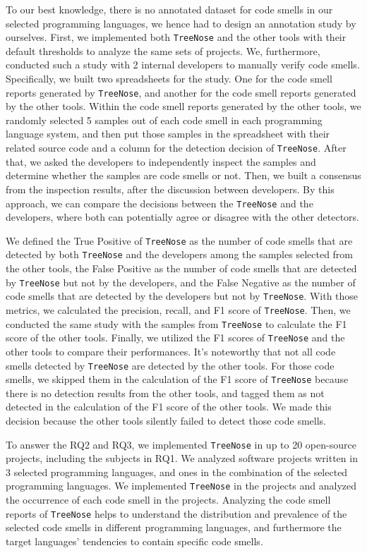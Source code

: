 To our best knowledge, there is no annotated dataset for code smells in our
selected programming languages, we hence had to design an annotation study by
ourselves. First, we implemented both \texttt{TreeNose} and the other tools
with their default thresholds to analyze the same sets of projects. We,
furthermore, conducted such a study with 2 internal developers to manually
verify code smells. Specifically, we built two spreadsheets for the study. One
for the code smell reports generated by \texttt{TreeNose}, and another for the
code smell reports generated by the other tools. Within the code smell reports
generated by the other tools, we randomly selected 5 samples out of each code
smell in each programming language system, and then put those samples in the
spreadsheet with their related source code and a column for the detection
decision of \texttt{TreeNose}. After that, we asked the developers to
independently inspect the samples and determine whether the samples are code
smells or not. Then, we built a consensus from the inspection results, after
the discussion between developers. By this approach, we can compare the
decisions between the \texttt{TreeNose} and the developers, where both can
potentially agree or disagree with the other detectors.

We defined the True Positive of \texttt{TreeNose} as the number of code smells
that are detected by both \texttt{TreeNose} and the developers among the
samples selected from the other tools, the False Positive as the number of code
smells that are detected by \texttt{TreeNose} but not by the developers, and
the False Negative as the number of code smells that are detected by the
developers but not by \texttt{TreeNose}. With those metrics, we calculated the
precision, recall, and F1 score of \texttt{TreeNose}. Then, we conducted the
same study with the samples from \texttt{TreeNose} to calculate the F1 score of
the other tools. Finally, we utilized the F1 scores of \texttt{TreeNose} and
the other tools to compare their performances. It's noteworthy that not all
code smells detected by \texttt{TreeNose} are detected by the other tools. For
those code smells, we skipped them in the calculation of the F1 score of
\texttt{TreeNose} because there is no detection results from the other tools,
and tagged them as not detected in the calculation of the F1 score of the other
tools. We made this decision because the other tools silently failed to detect
those code smells.

To answer the RQ2 and RQ3, we implemented \texttt{TreeNose} in up to 20
open-source projects, including the subjects in RQ1. We analyzed software
projects written in 3 selected programming languages, and ones in the
combination of the selected programming languages. We implemented
\texttt{TreeNose} in the projects and analyzed the occurrence of each code
smell in the projects. Analyzing the code smell reports of \texttt{TreeNose}
helps to understand the distribution and prevalence of the selected code smells
in different programming languages, and furthermore the target languages'
tendencies to contain specific code smells.


